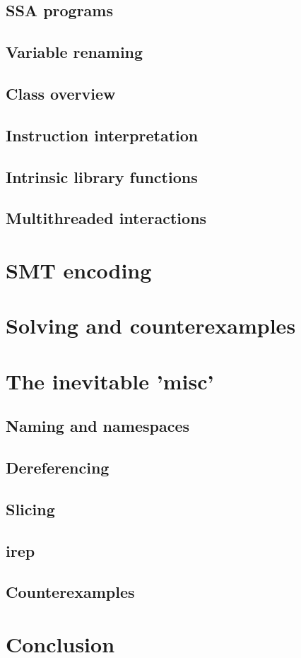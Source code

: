 \documentclass{article}
\begin{document}
\subsection{SSA programs}
\subsection{Variable renaming}
\subsection{Class overview}
\subsection{Instruction interpretation}
\subsection{Intrinsic library functions}
\subsection{Multithreaded interactions}

\section{SMT encoding}
\section{Solving and counterexamples}
\section{The inevitable 'misc'}
\subsection{Naming and namespaces}
\subsection{Dereferencing}
\subsection{Slicing}
\subsection{irep}
\subsection{Counterexamples}
\section{Conclusion}
\end{document}
